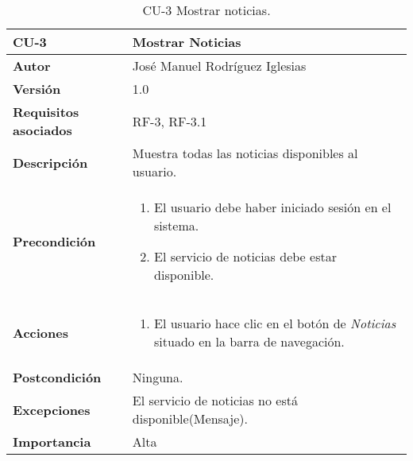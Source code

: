\begin{table}[h]
	\centering
	\begin{tabularx}{\linewidth}{ p{} p{} }
		\toprule
		\textbf{CU-3}    & \textbf{Mostrar Noticias}\\
		\toprule
            \textbf{Autor}                & José Manuel Rodríguez Iglesias \\
		\textbf{Versión}              & 1.0    \\
		\textbf{Requisitos asociados} & RF-3, RF-3.1 \\
		\textbf{Descripción}          & Muestra todas las noticias disponibles al usuario. \\
		\textbf{Precondición}         &  
            \begin{enumerate}
			\def\labelenumi{\arabic{enumi}.}
			\tightlist
			\item El usuario debe haber iniciado sesión en el sistema.
			\item El servicio de noticias debe estar disponible.
		\end{enumerate}\\
    
  
		\textbf{Acciones}             &
		\begin{enumerate}
			\def\labelenumi{\arabic{enumi}.}
			\tightlist
			\item El usuario hace clic en el botón de \textit{Noticias} situado en la barra de navegación.
		\end{enumerate}\\
		\textbf{Postcondición}        & Ninguna. \\
		\textbf{Excepciones}          & El servicio de noticias no está disponible(Mensaje).\\
		\textbf{Importancia}          & Alta\\
		\bottomrule
	\end{tabularx}
	\caption{CU-3 Mostrar noticias.}
\end{table}

